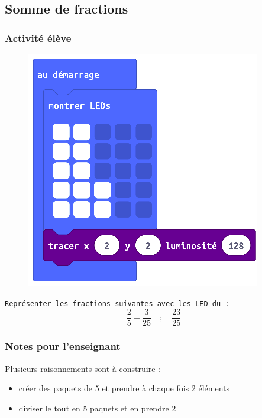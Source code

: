 %
%
\newpage
\subsection{Somme de fractions}
\subsubsection{Activité élève}


%
%
\begin{figure}
    \includegraphics[width=\linewidth]{res/mb-fraction2.png}
\end{figure}

\begin{eleve}    
    \texttt{Représenter les fractions suivantes avec les LED du \mb :}
    $$
    \frac{2}{5} + \frac{3}{25} \quad ; \quad \frac{23}{25}
    $$
\end{eleve}

%
%
\subsubsection{Notes pour l'enseignant}

\begin{remarque}
Plusieurs raisonnements sont à construire :
\begin{itemize}
    \item créer des paquets de 5 et prendre à chaque fois 2 éléments 
    \item diviser le tout en 5 paquets et en prendre 2
    
\end{itemize}
    
\end{remarque}